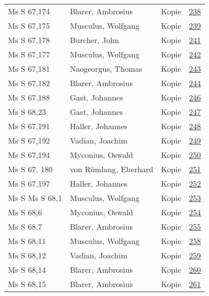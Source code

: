 \documentclass[10pt,a4paper,landscape]{report}
\begin{document}
\begin{longtable}{p{16cm}p{4cm}lr}
Ms S 67,174	&	Blarer, Ambrosius	&	Kopie	&	\href{http://130.60.24.72/assignment/238}{238}\\
Ms S 67,175	&	Musculus, Wolfgang	&	Kopie	&	\href{http://130.60.24.72/assignment/239}{239}\\
Ms S 67,178	&	Burcher, John	&	Kopie	&	\href{http://130.60.24.72/assignment/241}{241}\\
Ms S 67,177	&	Musculus, Wolfgang	&	Kopie	&	\href{http://130.60.24.72/assignment/242}{242}\\
Ms S 67,181	&	Naogeorgus, Thomas	&	Kopie	&	\href{http://130.60.24.72/assignment/243}{243}\\
Ms S 67,182	&	Blarer, Ambrosius	&	Kopie	&	\href{http://130.60.24.72/assignment/244}{244}\\
Ms S 67,188	&	Gast, Johannes	&	Kopie	&	\href{http://130.60.24.72/assignment/246}{246}\\
Ms S 68,23	&	Gast, Johannes	&	Kopie	&	\href{http://130.60.24.72/assignment/247}{247}\\
Ms S 67,191	&	Haller, Johannes	&	Kopie	&	\href{http://130.60.24.72/assignment/248}{248}\\
Ms S 67,192	&	Vadian, Joachim	&	Kopie	&	\href{http://130.60.24.72/assignment/249}{249}\\
Ms S 67,194	&	Myconius, Oswald	&	Kopie	&	\href{http://130.60.24.72/assignment/250}{250}\\
Ms S 67, 180	&	von Rümlang, Eberhard	&	Kopie	&	\href{http://130.60.24.72/assignment/251}{251}\\
Ms S 67,197	&	Haller, Johannes	&	Kopie	&	\href{http://130.60.24.72/assignment/252}{252}\\
Ms S Ms S 68,1	&	Musculus, Wolfgang	&	Kopie	&	\href{http://130.60.24.72/assignment/253}{253}\\
Ms S 68,6	&	Myconius, Oswald	&	Kopie	&	\href{http://130.60.24.72/assignment/254}{254}\\
Ms S 68,7	&	Blarer, Ambrosius	&	Kopie	&	\href{http://130.60.24.72/assignment/255}{255}\\
Ms S 68,11	&	Musculus, Wolfgang	&	Kopie	&	\href{http://130.60.24.72/assignment/258}{258}\\
Ms S 68,12	&	Vadian, Joachim	&	Kopie	&	\href{http://130.60.24.72/assignment/259}{259}\\
Ms S 68,14	&	Blarer, Ambrosius	&	Kopie	&	\href{http://130.60.24.72/assignment/260}{260}\\
Ms S 68,15	&	Blarer, Ambrosius	&	Kopie	&	\href{http://130.60.24.72/assignment/261}{261}\\

\end{longtable}
\end{document}
